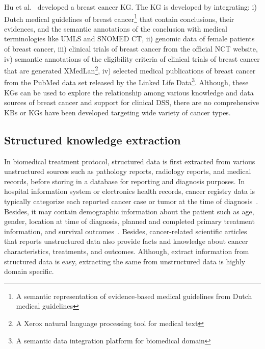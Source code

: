 \hspace*{3.5mm} Hu et al.~\cite{hu2015semantic} developed a breast cancer KG. The KG is developed by integrating: i) Dutch medical guidelines of breast cancer\footnote{A semantic representation of evidence-based medical guidelines from Dutch medical guidelines} that contain conclusions, their evidences, and the semantic annotations of the conclusion with medical terminologies like UMLS and SNOMED CT, ii) genomic data of female patients of breast cancer, iii) clinical trials of breast cancer from the official NCT website, iv) semantic annotations of the eligibility criteria of clinical trials of breast cancer that are generated XMedLan\footnote{A Xerox natural language processing tool for medical text}, iv) selected medical publications of breast cancer from the PubMed data set released by the Linked Life Data\footnote{A semantic data integration platform for biomedical domain}. 
Although, these KGs can be used to explore the relationship among various knowledge and data sources of breast cancer and support for clinical DSS, there are no comprehensive KBs or KGs have been developed targeting wide variety of cancer types. 
\subsection{Structured knowledge  extraction}
In biomedical treatment protocol, structured data is first extracted from various unstructured sources such as pathology reports, radiology reports, and medical records, before storing in a database for reporting and diagnosis purposes. In hospital information system or electronics health records, cancer registry data is typically categorize each reported cancer case or tumor at the time of diagnosis~\cite{hasan2020knowledge}. Besides, it may contain demographic information about the patient such as age, gender, location at time of diagnosis, planned and completed primary treatment information, and survival outcomes~\cite{hasan2020knowledge}. Besides, cancer-related scientific articles that reports unstructured data also provide facts and knowledge about cancer characteristics, treatments, and outcomes. Although, extract information from structured data is easy, extracting the same from unstructured data is highly domain specific. 

